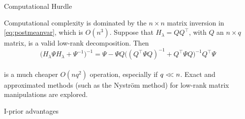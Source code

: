 \documentclass{beamer}
\newlength{\onecolwid}
\newlength{\twocolwid}
\begin{document}
\begin{frame}[t]
\begin{columns}[t]
\begin{column}{\twocolwid}
\begin{columns}[t,totalwidth=\twocolwid]  %
\begin{column}{\onecolwid}  %



\begin{block}{Computational Hurdle}

Computational complexity is dominated by the $n \times n$ matrix inversion in \eqref{eq:postmeanvar}, which is $O(n^3)$. Suppose that $H_\lambda = QQ^\top$, with $Q$ an $n \times q$ matrix, is a valid low-rank decomposition. Then
~\\[-18pt]
\[
  \big(H_\lambda \Psi H_\lambda + \Psi^{-1}\big)^{-1} = \Psi - \Psi Q \big((Q^\top \Psi Q)^{-1} + Q^\top \Psi Q\big)^{-1} Q^\top \Psi
\]
~\\[-28pt]
is a much cheaper $O(nq^2)$ operation, especially if $q <\!\!< n$. 
Exact and approximated methods (such as the Nyström method) for low-rank matrix manipulations are explored.

\end{block}



\begin{alertblock}{I-prior advantages}


\end{alertblock}
\end{column}
\end{columns}
\end{column}
\end{columns}
\end{frame}
\end{document}
